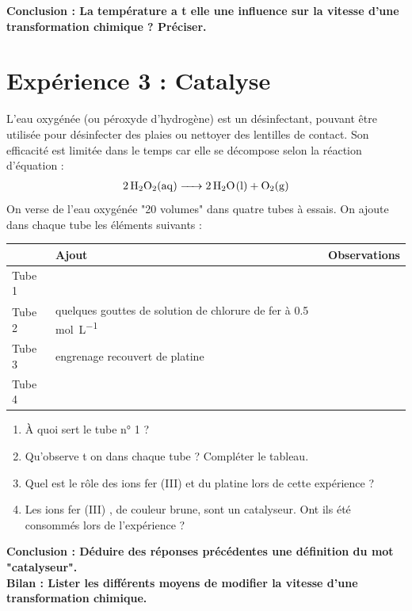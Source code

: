 \documentclass[a4paper,11pt,fleqn]{article}%
\begin{document}
\textbf{Conclusion : La température a t elle une influence sur la vitesse d'une transformation chimique ? Préciser.}

\section*{Expérience 3 : Catalyse}
L'eau oxygénée (ou péroxyde d'hydrogène)  est un désinfectant, pouvant être utilisée pour désinfecter des plaies ou nettoyer des lentilles de contact. Son efficacité est limitée dans le temps car elle se décompose selon la réaction d'équation :
\begin{eqnarray}
    \ce{2H2O2(aq) -> 2H2O(l) + O2(g)} \nonumber
\end{eqnarray}
On verse de l'eau oxygénée "20 volumes" dans quatre tubes à essais. On ajoute dans chaque tube les éléments suivants :
\begin{table}[h!]
    \centering
    \begin{tabular}{|>{\centering}m{2cm}|>{\centering}m{6cm}|>{\centering\arraybackslash}m{9cm}|}
    \hline  \rule[.5cm]{0cm}{0cm} & Ajout & Observations\\
    \hline Tube 1 & &  \rule[1cm]{0cm}{0cm}\\
    \hline Tube 2 & quelques gouttes de solution de chlorure de fer à \num{0,5} \unit{\mole\per\liter} & \rule[1cm]{0cm}{0cm}\\
    \hline Tube 3 & engrenage recouvert de platine & \rule[1cm]{0cm}{0cm}\\
    \hline Tube 4 & & \rule[1cm]{0cm}{0cm}\\
    \hline
    \end{tabular}
    \label{tab:my_label}
\end{table}
\begin{enumerate}
    \item À quoi sert le tube n° 1 ?
    \item Qu'observe t on dans chaque tube ? Compléter le tableau.
    \item Quel est le rôle  des ions fer (III)  et du platine lors de cette expérience ?
    \item Les ions fer (III) , de couleur brune, sont un catalyseur. Ont ils été consommés lors de l'expérience ?
\end{enumerate}
\textbf{Conclusion : Déduire des réponses précédentes une définition du mot "catalyseur".}\\
\textbf{Bilan : Lister les différents moyens de modifier la vitesse d'une transformation chimique.}
\end{document}
